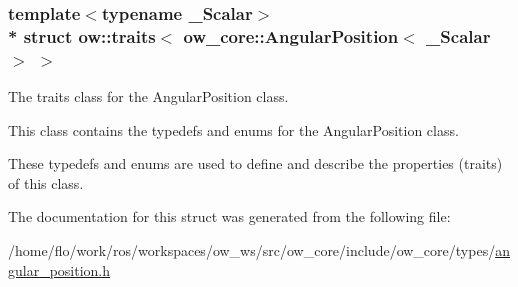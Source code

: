 \subsubsection*{template$<$typename \+\_\+\+Scalar$>$\\*
struct ow\+::traits$<$ ow\+\_\+core\+::\+Angular\+Position$<$ \+\_\+\+Scalar $>$ $>$}

The traits class for the Angular\+Position class. 

This class contains the typedefs and enums for the Angular\+Position class.

These typedefs and enums are used to define and describe the properties (traits) of this class. 

The documentation for this struct was generated from the following file\+:\begin{DoxyCompactItemize}
\item 
/home/flo/work/ros/workspaces/ow\+\_\+ws/src/ow\+\_\+core/include/ow\+\_\+core/types/\hyperlink{angular__position_8h}{angular\+\_\+position.\+h}\end{DoxyCompactItemize}
